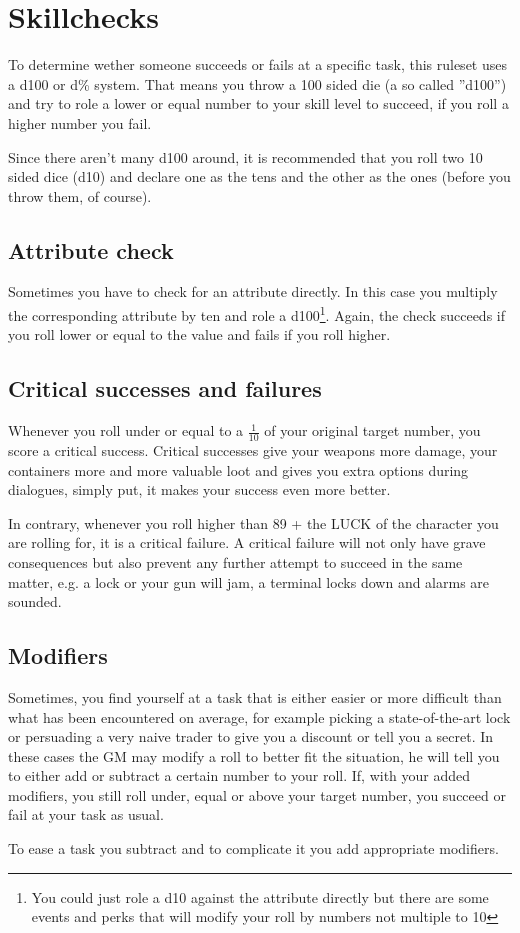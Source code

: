 \section{Skillchecks}
To determine wether someone succeeds or fails at a specific task, this ruleset uses a d100 or d\% system. That means you throw a 100 sided die (a so called ''d100'') and try to role a lower or equal number to your skill level to succeed, if you roll a higher number you fail.

Since there aren't many d100 around, it is recommended that you roll two 10 sided dice (d10) and declare one as the tens and the other as the ones (before you throw them, of course).
\subsection{Attribute check}
Sometimes you have to check for an attribute directly. In this case you multiply the corresponding attribute by ten and role a d100\footnote{You could just role a d10 against the attribute directly but there are some events and perks that will modify your roll by numbers not multiple to 10}. Again, the check succeeds if you roll lower or equal to the value and fails if you roll higher.
\subsection{Critical successes and \mbox{failures}}
Whenever you roll under or equal to a $\frac{1}{10}$ of your original target number, you score a critical success. Critical successes give your weapons more damage, your containers more and more valuable loot and gives you extra options during dialogues, simply put, it makes your success even more better.

In contrary, whenever you roll higher than 89 + the LUCK of the character you are rolling for, it is a critical failure. A critical failure will not only have grave consequences but also prevent any further attempt to succeed in the same matter, e.g. a lock or your gun will jam, a terminal locks down and alarms are sounded.
\subsection{Modifiers}
Sometimes, you find yourself at a task that is either easier or more difficult than what has been encountered on average, for example picking a state-of-the-art lock or persuading a very naive trader to give you a discount or tell you a secret. In these cases the GM may modify a roll to better fit the situation, he will tell you to either add or subtract a certain number to your roll. If, with your added modifiers, you still roll under, equal or above your target number, you succeed or fail at your task as usual.

To ease a task you subtract and to complicate it you add appropriate modifiers.